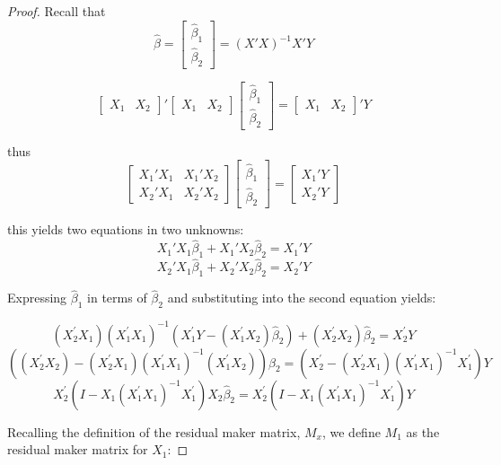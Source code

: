 \documentclass[DIV=14,titlepage=false]{scrreprt}
\begin{document}
\begin{proof}

Recall that \[\hat{\beta}=\begin{bmatrix}
  \hat{\beta}_1 \\ \hat{\beta}_2
\end{bmatrix}=(X'X)^{-1}X'Y\]

\[\begin{bmatrix}X_1 & X_2\end{bmatrix}'\begin{bmatrix}X_1 & X_2\end{bmatrix} \begin{bmatrix}
\hat{\beta}_1 \\ \hat{\beta}_2 \end{bmatrix} = \begin{bmatrix}X_1 & X_2\end{bmatrix}'Y\]
  
thus \[\begin{bmatrix}
  X_1'X_1 & X_1'X_2 \\ X_2'X_1 & X_2'X_2 
\end{bmatrix}
\begin{bmatrix}
  \hat{\beta}_1 \\ \hat{\beta}_2
\end{bmatrix}= \begin{bmatrix}
  X_1'Y \\ X_2'Y
\end{bmatrix}\]

this yields two equations in two unknowns:
\[X_1'X_1\hat{\beta}_1+X_1'X_2\hat{\beta}_2=X_1'Y\]
\[X_2'X_1\hat{\beta}_1+X_2'X_2\hat{\beta}_2=X_2'Y\]

Expressing \(\hat{\beta}_1\) in terms of \(\hat{\beta}_2\) and substituting into the second equation yields:

\[
  (X_{2}^{\prime}X_{1})(X_{1}^{\prime}X_{1})^{-1}(X_{1}^{\prime}Y-(X_{1}^{\prime}X_{2})\hat{\beta}_{2})+(X_{2}^{\prime}X_{2})\hat{\beta}_{2} = X_{2}^{\prime}Y
\]
\[
  ((X_{2}^{\prime}X_{2})-(X_{2}^{\prime}X_{1})(X_{1}^{\prime}X_{1})^{-1}(X_{1}^{\prime}X_{2}))\hat{\beta}_{2} = (X_{2}^{\prime}-(X_{2}^{\prime}X_{1})(X_{1}^{\prime}X_{1})^{-1}X_{1}^{\prime})Y
\]
\[
  X_{2}^{\prime}(I-X_{1}(X_{1}^{\prime}X_{1})^{-1}X_{1}^{\prime})X_{2}\hat{\beta}_{2} = X_{2}^{\prime}(I-X_{1}(X_{1}^{\prime}X_{1})^{-1}X_{1}^{\prime})Y
\]

Recalling the definition of the residual maker matrix, $M_x$, we define $M_1$ as the residual maker matrix for $X_1$:


\end{proof}
\end{document}
